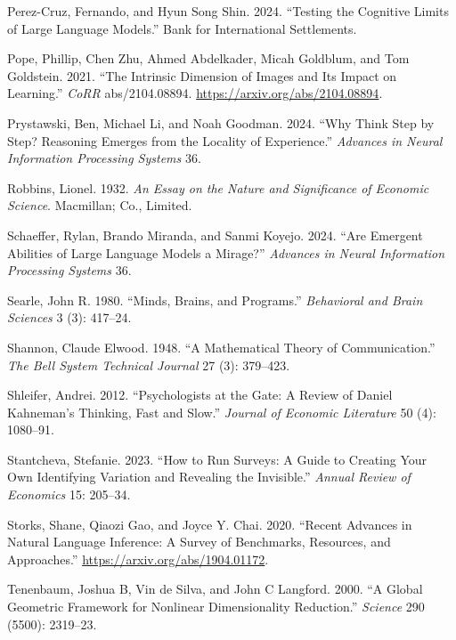 \documentclass[
]{article}
\newlength{\cslhangindent}
\newenvironment{CSLReferences}[2] %
 {\begin{list}{}{%
  \setlength{\itemindent}{0pt}
  \setlength{\leftmargin}{0pt}
  \setlength{\parsep}{0pt}
  \ifodd #1
   \setlength{\leftmargin}{\cslhangindent}
   \setlength{\itemindent}{-1\cslhangindent}
  \fi
  \setlength{\itemsep}{#2\baselineskip}}}
 {\end{list}}
\begin{document}
\begin{CSLReferences}{1}{0}
Perez-Cruz, Fernando, and Hyun Song Shin. 2024. {``Testing the Cognitive
Limits of Large Language Models.''} Bank for International Settlements.

Pope, Phillip, Chen Zhu, Ahmed Abdelkader, Micah Goldblum, and Tom
Goldstein. 2021. {``The Intrinsic Dimension of Images and Its Impact on
Learning.''} \emph{CoRR} abs/2104.08894.
\url{https://arxiv.org/abs/2104.08894}.

Prystawski, Ben, Michael Li, and Noah Goodman. 2024. {``Why Think Step
by Step? Reasoning Emerges from the Locality of Experience.''}
\emph{Advances in Neural Information Processing Systems} 36.

Robbins, Lionel. 1932. \emph{An Essay on the Nature and Significance of
Economic Science}. Macmillan; Co., Limited.

Schaeffer, Rylan, Brando Miranda, and Sanmi Koyejo. 2024. {``Are
Emergent Abilities of Large Language Models a Mirage?''} \emph{Advances
in Neural Information Processing Systems} 36.

Searle, John R. 1980. {``Minds, Brains, and Programs.''}
\emph{Behavioral and Brain Sciences} 3 (3): 417--24.

Shannon, Claude Elwood. 1948. {``A Mathematical Theory of
Communication.''} \emph{The Bell System Technical Journal} 27 (3):
379--423.

Shleifer, Andrei. 2012. {``Psychologists at the Gate: A Review of Daniel
Kahneman's Thinking, Fast and Slow.''} \emph{Journal of Economic
Literature} 50 (4): 1080--91.

Stantcheva, Stefanie. 2023. {``How to Run Surveys: A Guide to Creating
Your Own Identifying Variation and Revealing the Invisible.''}
\emph{Annual Review of Economics} 15: 205--34.

Storks, Shane, Qiaozi Gao, and Joyce Y. Chai. 2020. {``Recent Advances
in Natural Language Inference: A Survey of Benchmarks, Resources, and
Approaches.''} \url{https://arxiv.org/abs/1904.01172}.

Tenenbaum, Joshua B, Vin de Silva, and John C Langford. 2000. {``A
Global Geometric Framework for Nonlinear Dimensionality Reduction.''}
\emph{Science} 290 (5500): 2319--23.


\end{CSLReferences}
\end{document}
